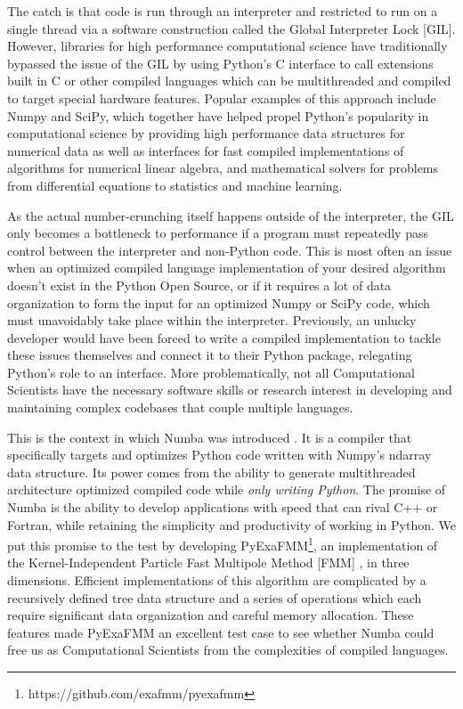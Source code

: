 \documentclass{IEEEcsmag}
\begin{document}
The catch is that code is run through an interpreter and restricted to run on a single thread via a software construction called the Global Interpreter Lock [GIL]. However, libraries for high performance computational science have traditionally bypassed the issue of the GIL by using Python's C interface to call extensions built in C or other compiled languages which can be multithreaded and compiled to target special hardware features. Popular examples of this approach include Numpy and SciPy, which together have helped propel Python's popularity in computational science by providing high performance data structures for numerical data as well as interfaces for fast compiled implementations of algorithms for numerical linear algebra, and mathematical solvers for problems from differential equations to statistics and machine learning.

As the actual number-crunching itself happens outside of the interpreter, the GIL only becomes a bottleneck to performance if a program must repeatedly pass control between the interpreter and non-Python code. This is most often an issue when an optimized compiled language implementation of your desired algorithm doesn't exist in the Python Open Source, or if it requires a lot of data organization to form the input for an optimized Numpy or SciPy code, which must unavoidably take place within the interpreter. Previously, an unlucky developer would have been forced to write a compiled implementation to tackle these issues themselves and connect it to their Python package, relegating Python's role to an interface. More problematically, not all Computational Scientists have the necessary software skills or research interest in developing and maintaining complex codebases that couple multiple languages.

This is the context in which Numba was introduced \cite{Lam2015}. It is a compiler that specifically targets and optimizes Python code written with Numpy's ndarray data structure. Its power comes from the ability to generate multithreaded architecture optimized compiled code while \textit{only writing Python}. The promise of Numba is the ability to develop applications with speed that can rival C++ or Fortran, while retaining the simplicity and productivity of working in Python. We put this promise to the test by developing PyExaFMM\footnote{https://github.com/exafmm/pyexafmm}, an implementation of the Kernel-Independent Particle Fast Multipole Method [FMM] \cite{Ying2004,Greengard1987}, in three dimensions. Efficient implementations of this algorithm are complicated by a recursively defined tree data structure and a series of operations which each require significant data organization and careful memory allocation. These features made PyExaFMM an excellent test case to see whether Numba could free us as Computational Scientists from the complexities of compiled languages.
\end{document}
